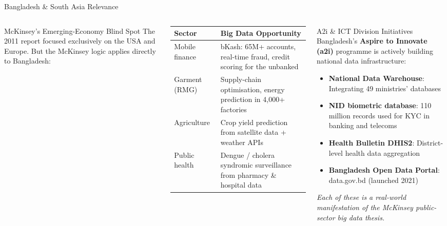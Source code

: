 \documentclass[aspectratio=169,10pt]{beamer}
\begin{document}
\begin{frame}{Bangladesh \& South Asia Relevance}
  \begin{columns}[T]
      \begin{block}{McKinsey's Emerging-Economy Blind Spot}
        The 2011 report focused exclusively on the USA and Europe. But the McKinsey logic applies directly to Bangladesh:
      \end{block}
      \vspace{6pt}
      \renewcommand{\arraystretch}{1.3}
      \begin{tabular}{p{2.2cm}p{4.2cm}}
        \toprule
        \textbf{Sector} & \textbf{Big Data Opportunity} \\
        \midrule
        Mobile finance & bKash: 65M+ accounts, real-time fraud, credit scoring for the unbanked \\
        Garment (RMG) & Supply-chain optimisation, energy prediction in 4{,}000+ factories \\
        Agriculture & Crop yield prediction from satellite data + weather APIs \\
        Public health & Dengue / cholera syndromic surveillance from pharmacy \& hospital data \\
        \bottomrule
      \end{tabular}

      \begin{alertblock}{A2i \& ICT Division Initiatives}
        Bangladesh's \textbf{Aspire to Innovate (a2i)} programme is actively building national data infrastructure:
        \vspace{4pt}
        \begin{itemize}
          \item \textbf{National Data Warehouse}: Integrating 49 ministries' databases
          \item \textbf{NID biometric database}: 110 million records used for KYC in banking and telecoms
          \item \textbf{Health Bulletin DHIS2}: District-level health data aggregation
          \item \textbf{Bangladesh Open Data Portal}: data.gov.bd (launched 2021)
        \end{itemize}
        \vspace{4pt}
        \textit{Each of these is a real-world manifestation of the McKinsey public-sector big data thesis.}
      \end{alertblock}
  \end{columns}
\end{frame}
\end{document}
